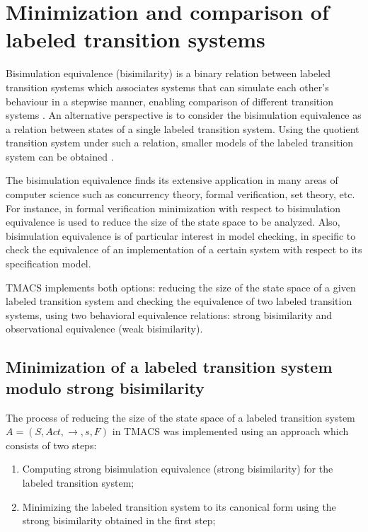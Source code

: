 \section{Minimization and comparison of labeled transition systems}
\label{sec:bisimulation}

Bisimulation equivalence (bisimilarity) \cite{Park} is a binary relation between labeled transition systems which associates systems that can simulate each other's behaviour in a stepwise manner, enabling comparison of different transition systems \cite{ModelChecking}. An alternative perspective is to consider the bisimulation equivalence as a relation between states of a single labeled transition system. Using the quotient transition system under such a relation, smaller models of the labeled transition system can be obtained \cite{ModelChecking}.

The bisimulation equivalence finds its extensive application in many areas of computer science such as concurrency theory, formal verification, set theory, etc. For instance, in formal verification minimization with respect to bisimulation equivalence is used to reduce the size of the state space to be analyzed. Also, bisimulation equivalence is of particular interest in model checking, in specific to check the equivalence of an implementation of a certain system with respect to its specification model.

TMACS implements both options: reducing the size of the state space of a given labeled transition system and checking the equivalence of two labeled transition systems, using two behavioral equivalence relations: strong bisimilarity and observational equivalence (weak bisimilarity).

\subsection{Minimization of a labeled transition system modulo strong bisimilarity}
The process of reducing the size of the state space of a labeled transition system $A=\left(S, Act, \rightarrow, s, F \right)$ in TMACS was implemented using an approach which consists of two steps:
\begin{enumerate}
\item Computing strong bisimulation equivalence (strong bisimilarity) for the labeled transition system;
\item Minimizing the labeled transition system to its canonical form using the strong bisimilarity obtained in the first step;
\end{enumerate}

